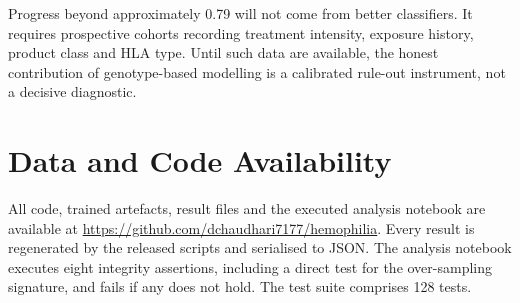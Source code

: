 \documentclass[conference]{IEEEtran}
\begin{document}
Progress beyond approximately 0.79 will not come from better classifiers. It
requires prospective cohorts recording treatment intensity, exposure history,
product class and HLA type. Until such data are available, the honest
contribution of genotype-based modelling is a calibrated rule-out instrument,
not a decisive diagnostic.

\section*{Data and Code Availability}
All code, trained artefacts, result files and the executed analysis notebook
are available at \url{https://github.com/dchaudhari7177/hemophilia}. Every
result is regenerated by the released scripts and serialised to JSON. The
analysis notebook executes eight integrity assertions, including a direct test
for the over-sampling signature, and fails if any does not hold. The test suite
comprises 128 tests.
\end{document}
